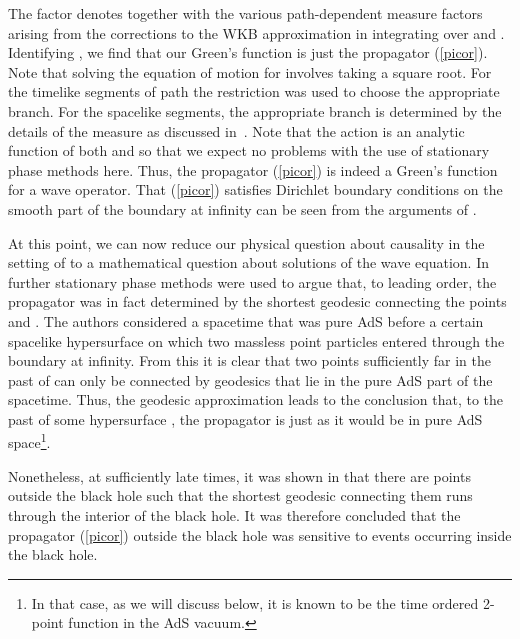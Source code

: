 \documentclass[a4paper,12pt]{article}
\begin{document}
The factor \coordHE{} denotes \coordHE{} together with the various
path-dependent measure factors arising from the corrections to the WKB
approximation in integrating over \coordHE{} and \coordHE{}.  Identifying \coordHE{}, we find that our Green's function is just the
propagator (\ref{picor}).  Note that solving the equation of motion
for \coordHE{} involves taking a square root.  For the timelike segments of
path the restriction \coordHE{} was used to choose the appropriate branch.
For the spacelike segments, the appropriate branch is determined by
the details of the measure as discussed in~\cite{piINST}.  Note that
the action is an analytic function of both \coordHE{} and \coordHE{} so that we
expect no problems with the use of stationary phase methods here.
Thus, the propagator (\ref{picor}) is indeed a Green's function for a
wave operator.  That (\ref{picor}) satisfies Dirichlet boundary
conditions on the smooth part of the boundary at infinity can be seen
from the arguments of \cite{Fuller}.

At this point, we can now reduce our physical question about causality
in the setting of \cite{holopart} to a mathematical question about
solutions of the wave equation.  In \cite{holopart} further stationary
phase methods were used to argue that, to leading order, the
propagator was in fact determined by the shortest geodesic connecting
the points \coordHE{} and \coordHE{}.  The authors considered a spacetime that was pure
AdS before a certain spacelike hypersurface \myHighlight{$\Sigma$}\coordHE{} on which two
massless point particles entered through the boundary at infinity.
{}From this it is clear that two points sufficiently far in the past
of \myHighlight{$\Sigma$}\coordHE{} can only be connected by geodesics that lie in the pure
AdS part of the spacetime.  Thus, the geodesic approximation leads to
the conclusion that, to the past of some hypersurface \coordHE{}, the
propagator is just as it would be in pure AdS space\footnote{In that
  case, as we will discuss below, it is known to be the time ordered
  2-point function in the AdS vacuum.}.

Nonetheless, at sufficiently late times, it was shown in
\cite{holopart} that there are points outside the black hole such that
the shortest geodesic connecting them runs through the interior of the
black hole.  It was therefore concluded that the propagator
(\ref{picor}) outside the black hole was sensitive to events occurring
inside the black hole.
\end{document}
